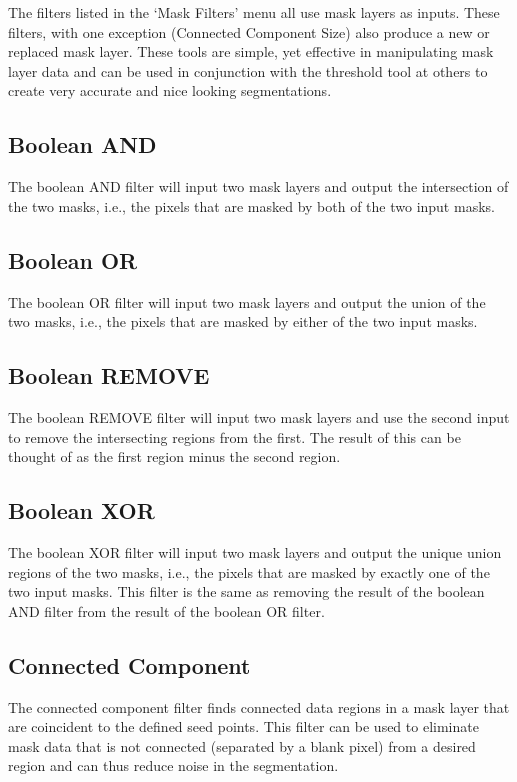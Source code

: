 \documentclass[fleqn,11pt,openany]{book}
\begin{document}
The filters listed in the `Mask Filters' menu all use mask layers as inputs.  These filters, with one exception (Connected Component Size) also produce a new or replaced mask layer.  These tools are simple, yet effective in manipulating mask layer data and can be used in conjunction with the threshold tool at others to create very accurate and nice looking segmentations.

\subsection{Boolean AND}

The boolean AND filter will input two mask layers and output the intersection of the two masks, i.e., the pixels that are masked by both of the two input masks.  

\subsection{Boolean OR}

The boolean OR filter will input two mask layers and output the union of the two masks, i.e., the pixels that are masked by either of the two input masks. 

\subsection{Boolean REMOVE}

The boolean REMOVE filter will input two mask layers and use the second input to remove the intersecting regions from the first.  The result of this can be thought of as the first region minus the second region.  

\subsection{Boolean XOR}

The boolean XOR filter will input two mask layers and output the unique union regions of the two masks, i.e., the pixels that are masked by exactly one of the two input masks. This filter is the same as removing the result of the boolean AND filter from the result of the boolean OR filter.  

\subsection{Connected Component}

The connected component filter finds connected data regions in a mask layer that are coincident to the defined seed points.  This filter can be used to eliminate mask data that is not connected (separated by a blank pixel) from a desired region and can thus reduce noise in the segmentation.  
\end{document}
